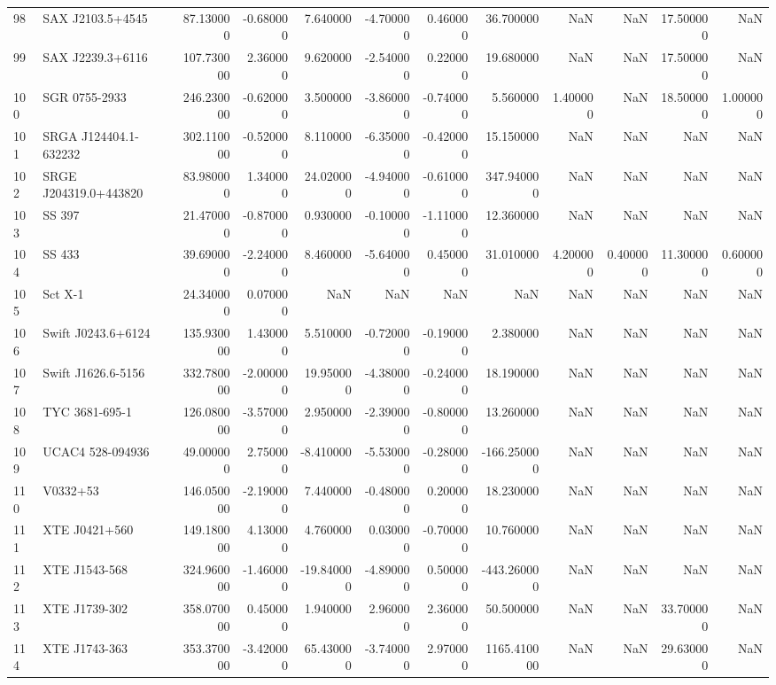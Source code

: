 \begin{tabular}{llrrrrrrrrrr}
98 & SAX J2103.5+4545 & 87.130000 & -0.680000 & 7.640000 & -4.700000 & 0.460000 & 36.700000 & NaN & NaN & 17.500000 & NaN \\
99 & SAX J2239.3+6116 & 107.730000 & 2.360000 & 9.620000 & -2.540000 & 0.220000 & 19.680000 & NaN & NaN & 17.500000 & NaN \\
100 & SGR 0755-2933 & 246.230000 & -0.620000 & 3.500000 & -3.860000 & -0.740000 & 5.560000 & 1.400000 & NaN & 18.500000 & 1.000000 \\
101 & SRGA J124404.1-632232 & 302.110000 & -0.520000 & 8.110000 & -6.350000 & -0.420000 & 15.150000 & NaN & NaN & NaN & NaN \\
102 & SRGE J204319.0+443820 & 83.980000 & 1.340000 & 24.020000 & -4.940000 & -0.610000 & 347.940000 & NaN & NaN & NaN & NaN \\
103 & SS 397 & 21.470000 & -0.870000 & 0.930000 & -0.100000 & -1.110000 & 12.360000 & NaN & NaN & NaN & NaN \\
104 & SS 433 & 39.690000 & -2.240000 & 8.460000 & -5.640000 & 0.450000 & 31.010000 & 4.200000 & 0.400000 & 11.300000 & 0.600000 \\
105 & Sct X-1 & 24.340000 & 0.070000 & NaN & NaN & NaN & NaN & NaN & NaN & NaN & NaN \\
106 & Swift J0243.6+6124 & 135.930000 & 1.430000 & 5.510000 & -0.720000 & -0.190000 & 2.380000 & NaN & NaN & NaN & NaN \\
107 & Swift J1626.6-5156 & 332.780000 & -2.000000 & 19.950000 & -4.380000 & -0.240000 & 18.190000 & NaN & NaN & NaN & NaN \\
108 & TYC 3681-695-1 & 126.080000 & -3.570000 & 2.950000 & -2.390000 & -0.800000 & 13.260000 & NaN & NaN & NaN & NaN \\
109 & UCAC4 528-094936 & 49.000000 & 2.750000 & -8.410000 & -5.530000 & -0.280000 & -166.250000 & NaN & NaN & NaN & NaN \\
110 & V0332+53 & 146.050000 & -2.190000 & 7.440000 & -0.480000 & 0.200000 & 18.230000 & NaN & NaN & NaN & NaN \\
111 & XTE J0421+560 & 149.180000 & 4.130000 & 4.760000 & 0.030000 & -0.700000 & 10.760000 & NaN & NaN & NaN & NaN \\
112 & XTE J1543-568 & 324.960000 & -1.460000 & -19.840000 & -4.890000 & 0.500000 & -443.260000 & NaN & NaN & NaN & NaN \\
113 & XTE J1739-302 & 358.070000 & 0.450000 & 1.940000 & 2.960000 & 2.360000 & 50.500000 & NaN & NaN & 33.700000 & NaN \\
114 & XTE J1743-363 & 353.370000 & -3.420000 & 65.430000 & -3.740000 & 2.970000 & 1165.410000 & NaN & NaN & 29.630000 & NaN \\

\end{tabular}
